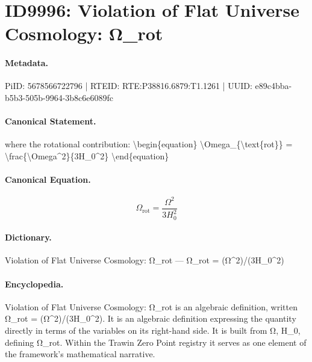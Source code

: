 \section*{ID9996: Violation of Flat Universe Cosmology: Ω\_rot}
\paragraph{Metadata.}
PiID: 5678566722796 | RTEID: RTE:P38816.6879:T1.1261 | UUID: e89c4bba-b5b3-505b-9964-3b8c6e6089fc

\paragraph{Canonical Statement.}
where the rotational contribution: \textbackslash{}begin\{equation\} \textbackslash{}Omega\_\{\textbackslash{}text\{rot\}\} = \textbackslash{}frac\{\textbackslash{}Omega\textasciicircum{}2\}\{3H\_0\textasciicircum{}2\} \textbackslash{}end\{equation\}

\paragraph{Canonical Equation.}
\[
\Omega_{\text{rot}} = \frac{\Omega^2}{3H_0^2}
\]

\paragraph{Dictionary.}
Violation of Flat Universe Cosmology: Ω\_rot — Ω\_rot = (Ω\textasciicircum{}2)/(3H\_0\textasciicircum{}2)

\paragraph{Encyclopedia.}
Violation of Flat Universe Cosmology: Ω\_rot is an algebraic definition, written Ω\_rot = (Ω\textasciicircum{}2)/(3H\_0\textasciicircum{}2). It is an algebraic definition expressing the quantity directly in terms of the variables on its right-hand side. It is built from Ω, H\_0, defining Ω\_rot. Within the Trawin Zero Point registry it serves as one element of the framework's mathematical narrative.
